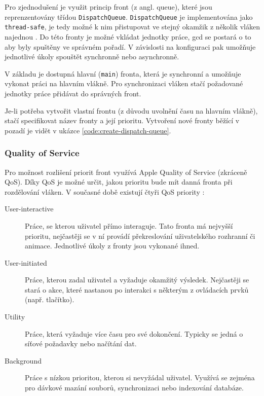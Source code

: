 Pro zjednodušení je využit princip front (z angl. queue), které jsou reprenzentovány třídou \texttt{DispatchQueue}.
\texttt{DispatchQueue} je implementována jako \texttt{thread-safe}, je tedy možné k nim přistupovat ve stejný okamžik z několik vláken najednou \cite{apple-concurrency-programming-guide}.
Do této fronty je možné vkládat jednotky práce, \acrshort{gcd} se postará o to aby byly spuštěny ve správném pořadí.
V závislosti na konfiguraci pak umožňuje jednotlivé úkoly spouštět synchronně nebo asynchronně.

V základu je dostupná hlavní (\texttt{main}) fronta, která je synchronní a umožňuje vykonat práci na hlavním vlákně.
Pro synchronizaci vláken stačí požadované jednotky práce přidávat do správných front.

Je-li potřeba vytvořit vlastní frontu (z důvodu uvolnění času na hlavním vlákně), stačí specifikovat název fronty a její prioritu.
Vytvoření nové fronty běžící v pozadí je vidět v ukázce \ref{code:create-dispatch-queue}.


\subsubsection*{Quality of Service}

Pro možnost rozlišení priorit front využívá Apple Quality of Service (zkráceně QoS).
Díky QoS je možné určit, jakou prioritu bude mít danná fronta při rozdělování vláken.
V současné době existují čtyři QoS priority \cite{apple-prioritize-work-with-qos}:

\begin{description}
  \item[User-interactive] Práce, se kterou uživatel přímo interaguje.
  Tato fronta má nejvyšší prioritu, nejčastěji se v ní provádí překreslování uživatelského rozhranní či animace.
  Jednotlivé úkoly z fronty jsou vykonané ihned.
  \item[User-initiated] Práce, kterou zadal uživatel a vyžaduje okamžitý výsledek.
  Nejčastěji se stará o akce, které nastanou po interakci s některým z ovládacích prvků (např. tlačítko).
  \item[Utility] Práce, která vyžaduje více času pro své dokončení.
  Typicky se jedná o síťové požadavky nebo načítání dat.
  \item[Background] Práce s nízkou prioritou, kterou si nevyžádal uživatel.
  Využívá se zejména pro dávkové mazání souborů, synchronizaci nebo indexování databáze.
\end{description}

